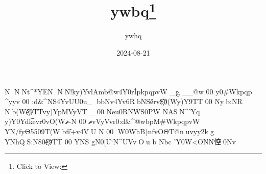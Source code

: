 \documentclass{article}
\title{ywbq\footnote{Click to View:\url{}}}
\author{ywhq}
\date{2024-08-21}
\begin{document}

\Large

N  NNt^*YEN 
 
 
 
  NN!ky)YvlAmb@w4Y 0rǏpkpqpvW
 
 _؏ _ _@w%
 
  0 0
 
 y 0#Wkpqp
 
 ^yyv%
 
  0 0
 
 :d&^ NS4YvUU\OTv0u_
 
 bbNv4Yv6Rb NSёrvS҉ 0(Wy)Y9TT
 
  0 0
 
 Nyb:NR%
 
 Nb(Wё҉9TTvy)YpMVyVT_
 
  0 0
 
 Neu0RNWS 0PW
NASN^'Yq\
 
 y)Y 0Ydke܏vr 0vO(Wޘ-N
 
  0 0
 
 ޘvVyVvr 0:d&^@wbpM#WkpqpvW
 
 YN/fyΘ55 09T(Wbfr͂+v4VU
N
 
  0 0
 
 W0WhB)nfvOΘT@nuvyy2kg
 
 YNhQS:N8\Te 0ё҉9TT
 
  0 0
 
 YNS	gN 0[U` N^UVvOu
 
 b%
Nbc
 
 'Y0W<ONN悾0Nv
\end{document}
